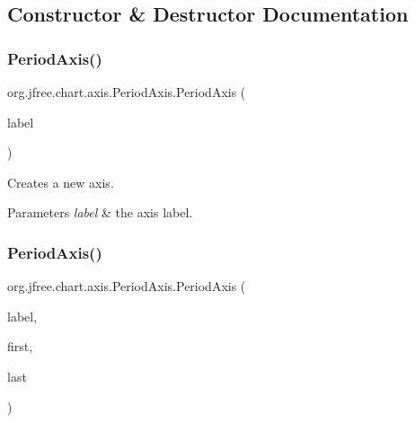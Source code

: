 \subsection{Constructor \& Destructor Documentation}
\mbox{\label{classorg_1_1jfree_1_1chart_1_1axis_1_1_period_axis_ae87599520fff923c5cc556643ff87f2e}} 
\subsubsection{\texorpdfstring{Period\+Axis()}{PeriodAxis()}\hspace{0.1cm}{\footnotesize\ttfamily [1/4]}}
{\footnotesize\ttfamily org.\+jfree.\+chart.\+axis.\+Period\+Axis.\+Period\+Axis (\begin{DoxyParamCaption}\item[{String}]{label }\end{DoxyParamCaption})}

Creates a new axis.


\begin{DoxyParams}{Parameters}
{\em label} & the axis label. \\
\hline
\end{DoxyParams}
\mbox{\label{classorg_1_1jfree_1_1chart_1_1axis_1_1_period_axis_a13de8634c2f1f9ca271895aa594164f2}} 
\subsubsection{\texorpdfstring{Period\+Axis()}{PeriodAxis()}\hspace{0.1cm}{\footnotesize\ttfamily [2/4]}}
{\footnotesize\ttfamily org.\+jfree.\+chart.\+axis.\+Period\+Axis.\+Period\+Axis (\begin{DoxyParamCaption}\item[{String}]{label,  }\item[{\mbox{\hyperlink{classorg_1_1jfree_1_1data_1_1time_1_1_regular_time_period}{Regular\+Time\+Period}}}]{first,  }\item[{\mbox{\hyperlink{classorg_1_1jfree_1_1data_1_1time_1_1_regular_time_period}{Regular\+Time\+Period}}}]{last }\end{DoxyParamCaption})}

